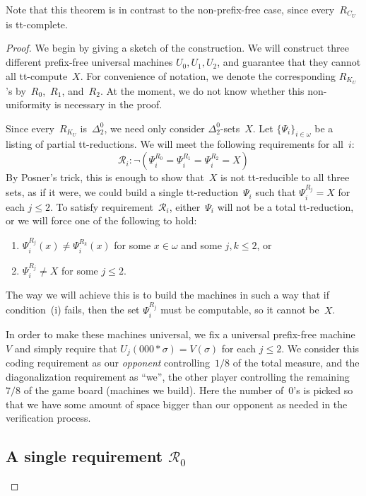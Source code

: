 \documentclass{LMCS}
\newcommand{\0}{\mathbf{0}}
\newcommand{\<}{\langle}
\renewcommand{\>}{\rangle}
\begin{document}
Note that this theorem is in contrast to the non-prefix-free case, since
every~$R_{C_U}$ is tt-complete.

\begin{proof}We begin by giving a sketch of the construction. We will construct three
different prefix-free universal machines ${U}_0,{U}_1,{U}_2$, and guarantee
that they cannot all tt-compute~$X$. For convenience of notation, we denote
the corresponding $R_{K_{U}}$'s by~$R_0$,~$R_1$, and~$R_2$. At the moment, we
do not know whether this non-uniformity is necessary in the proof.

Since every~$R_{K_{U}}$ is~$\Delta^0_2$, we need only consider
$\Delta^0_2$-sets~$X$.  Let $\{\Psi_i\}_{i\in \omega}$ be a listing of
partial tt-reductions.  We will meet the following requirements for all~$i$:
\[
\mathcal{R}_i: \neg(\Psi_i^{R_0}=\Psi_i^{R_1}=\Psi_i^{R_2}=X)
\]
By Posner's trick, this is enough to show that~$X$ is not tt-reducible to all
three sets, as if it were, we could build a single tt-reduction~$\Psi_i$ such
that $\Psi_i^{R_j}=X$ for each $j \le 2$.  To satisfy
requirement~$\mathcal{R}_i$, either~$\Psi_i$ will not be a total
tt-reduction, or we will force one of the following to hold:

\begin{enumerate}[label=(\roman*)]
\item $\Psi_i^{R_j}(x)\neq \Psi_i^{R_k}(x)$ for some $x\in \omega$ and
some $j,k \le 2$, or
\item $\Psi_i^{R_j}\neq X$ for some $j \le 2$.
\end{enumerate}
The way we will achieve this is to build the machines in such a way that if
condition~(i) fails, then the set $\Psi_i^{R_j}$ must be computable, so it
cannot be~$X$.

In order to make these machines universal, we fix a universal prefix-free
machine~${V}$ and simply require that ${U}_j(000*\sigma)={V}(\sigma)$ for
each $j \le 2$. We consider this coding requirement as our \emph{opponent}
controlling~$1/8$ of the total measure, and the diagonalization requirement
as ``we'', the other player controlling the remaining~$7/8$ of the game board
(machines we build). Here the number of~$0$'s is picked so that we have
some amount of space bigger than our opponent as needed in the verification
process.

\subsection{A single requirement \texorpdfstring{$\mathcal{R}_0$}{R0}}


\end{proof}
\end{document}
